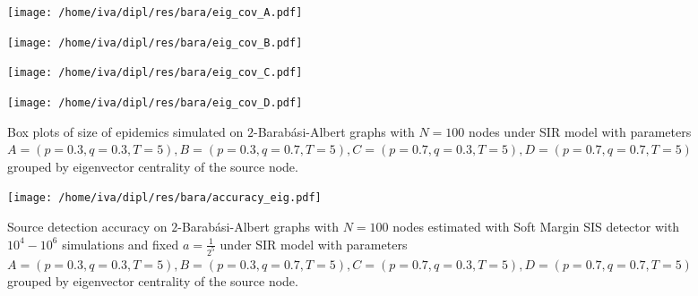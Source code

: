 \documentclass[times, utf8, diplomski]{fer}
\begin{document}
\begin{figure}[H]
\begin{minipage}{\textwidth}
\begin{minipage}{0.5\textwidth}
\texttt{[image: /home/iva/dipl/res/bara/eig\_cov\_A.pdf]}
\end{minipage}
\begin{minipage}{0.5\textwidth}
\texttt{[image: /home/iva/dipl/res/bara/eig\_cov\_B.pdf]}
\end{minipage}
\begin{minipage}{0.5\textwidth}
\texttt{[image: /home/iva/dipl/res/bara/eig\_cov\_C.pdf]}
\end{minipage}
\begin{minipage}{0.5\textwidth}
\texttt{[image: /home/iva/dipl/res/bara/eig\_cov\_D.pdf]}
\end{minipage}
\caption{Box plots of size of epidemics simulated on  $2$-Barab\'{a}si-Albert graphs  with $N=100$ nodes under SIR model with parameters $A = (p=0.3, q=0.3, T=5), B = (p=0.3, q=0.7, T=5), C = (p=0.7, q=0.3, T=5), D = (p=0.7, q=0.7, T=5)$ grouped by eigenvector centrality of the source node.}
\label{eig_cov}
\end{minipage}
\begin{minipage}{\textwidth}
\center
\texttt{[image: /home/iva/dipl/res/bara/accuracy\_eig.pdf]}
\caption{Source detection accuracy on  $2$-Barab\'{a}si-Albert graphs  with $N=100$ nodes estimated with Soft Margin SIS detector with $10^4 - 10^6$ simulations and fixed $a = \frac{1}{2^5}$ under SIR model with parameters $A = (p=0.3, q=0.3, T=5), B = (p=0.3, q=0.7, T=5), C = (p=0.7, q=0.3, T=5), D = (p=0.7, q=0.7, T=5)$ grouped by eigenvector centrality of the source node.}
\label{eig_acc}
\end{minipage}
\end{figure}
\end{document}

